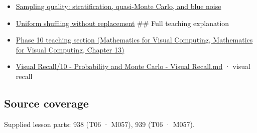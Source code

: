 \begin{itemize}
\item
  \hyperref[appendix-9f693ffd82bc]{Sampling quality: stratification, quasi-Monte Carlo, and blue noise}
\item
  \hyperref[appendix-184fcc411663]{Uniform shuffling without replacement} \#\# Full teaching explanation
\item
  \href{../02-Mathematics-for-Visual-Computing/main.pdf\#nameddest=02-foundations-ii-ch029-a-computer-produces-deterministic-pseudorandom-sequences}{Phase 10 teaching section (Mathematics for Visual Computing, Mathematics for Visual Computing, Chapter 13)}
\item
  \hyperref[appendix-cb5af353ef77]{Visual Recall/10 - Probability and Monte Carlo - Visual Recall.md} · visual recall
\end{itemize}

\subsection{Source coverage}\label{appendix-daaf25bfd3a0-source-coverage}

Supplied lesson parts: 938 (T06 · M057), 939 (T06 · M057).
